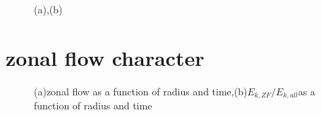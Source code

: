 \documentclass[11pt,a4paper]{article}
\begin{document}
\begin{figure}[H]
	\centering
	\caption{(a),(b)}
\end{figure}



\section{zonal flow character}

	\begin{figure}[H]
		\centering
		\caption{(a)zonal flow as a function of radius and time,(b)$E_{k,ZF}/E_{k,all}$as a function of radius and time}
	\end{figure}
\end{document}
